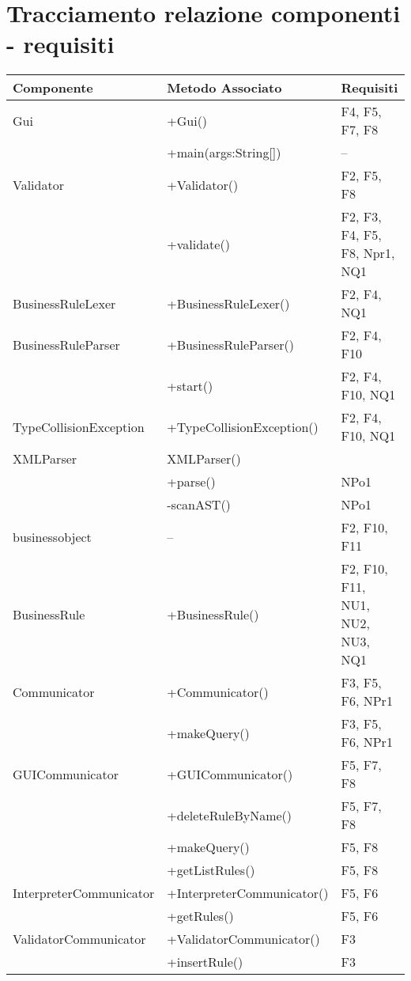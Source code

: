 \section{Tracciamento relazione componenti - requisiti}

\begin{tabular}{||p{4cm}||p{5cm}||p{3cm}||}\hline
Componente & Metodo Associato & Requisiti \\\hline
Gui & +Gui() & F4, F5, F7, F8 \\\cline{2-3}
& +main(args:String[]) & -- \\ \hline

Validator & +Validator() & F2, F5, F8 \\\cline{2-3}
& +validate() & F2, F3, F4, F5, F8, Npr1, NQ1 \\\hline

BusinessRuleLexer & +BusinessRuleLexer() & F2, F4, NQ1 \\\hline

BusinessRuleParser & +BusinessRuleParser() & F2, F4, F10 \\\cline{2-3}
& +start() & F2, F4, F10, NQ1 \\\hline

TypeCollisionException & +TypeCollisionException() & F2, F4, F10, NQ1 \\\hline

XMLParser & XMLParser() &  \\\cline{2-3}
& +parse() & NPo1 \\\cline{2-3}
& -scanAST() & NPo1 \\\hline

businessobject & -- & F2, F10, F11 \\\hline
BusinessRule & +BusinessRule() & F2, F10, F11, NU1, NU2, NU3, NQ1 \\\hline

Communicator & +Communicator() & F3, F5, F6, NPr1 \\\cline{2-3}
& +makeQuery() & F3, F5, F6, NPr1 \\\hline

GUICommunicator & +GUICommunicator() & F5, F7, F8 \\\cline{2-3}
& +deleteRuleByName() & F5, F7, F8 \\\cline{2-3}
& +makeQuery() & F5, F8 \\\cline{2-3}
& +getListRules() & F5, F8 \\\hline

InterpreterCommunicator & +InterpreterCommunicator() & F5, F6 \\\cline{2-3}
& +getRules() & F5, F6 \\\hline

ValidatorCommunicator & +ValidatorCommunicator() & F3 \\\cline{2-3}
& +insertRule() & F3 \\\hline
\end{tabular}

